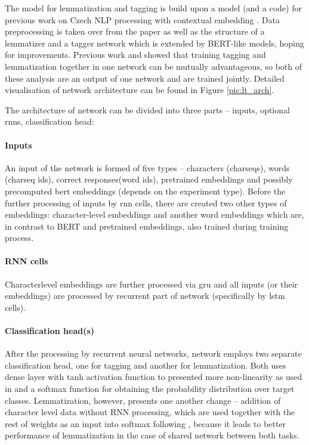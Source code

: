 

The model for lemmatization and tagging is build upon a model (and a code) for previous work on Czech NLP processing with contextual embedding \citep{straka2019czech}. 
Data preprocessing is taken over from the paper as well as the structure of a lemmatizer and a tagger network which is extended by BERT-like models, hoping for improvements. Previous work \citep{Straka2019} and \citep{Straka2018} showed that training tagging and lemmatization together in one network can be mutually advantageous, so both of these analysis are an output of one network and are trained jointly. Detailed visualisation of network architecture can be found in Figure \ref{pic:lt_arch}. \par The architecture of network can be divided into three parts -- inputs, optional \acrshort{rnn}s, classification head:
\paragraph{Inputs}
An input of the network is formed of five types -- characters (charseqs), words (charseq ids), correct responses(word ids), pretrained embeddings and possibly precomputed bert embeddings (depends on the experiment type). Before the further processing of inputs by \acrshort{rnn} cells, there are created two other types of embeddings: character-level embeddings and another word embeddings which are, in contrast to BERT and pretrained embeddings, also trained during training process.

\paragraph{RNN cells}
Characterlevel embeddings are further processed via \acrfull{gru} and all inputs (or their embeddings) are processed by recurrent part of network (specifically by \acrfull{lstm} cells).

\paragraph{Classification head(s)}
After the processing by recurrent neural networks, network employs two separate classification head, one for tagging and another for lemmatization. Both uses dense layer with tanh activation function to presented more non-linearity as used in \citep{2018} and a softmax function for obtaining the probability distribution over target classes. Lemmatization, however, presents one another change -- addition of character level data without RNN processing, which are used together with the rest of weights as an input into softmax following \citep{Straka2018}, because it leads to better performance of lemmatization in the case of shared network between both tasks.

